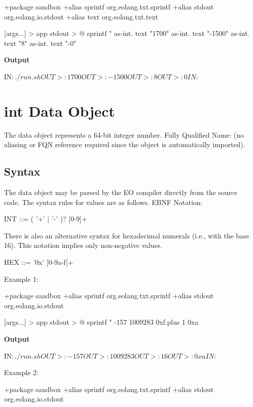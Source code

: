 \documentclass[12pt]{book}
\begin{document}
{\begin{ffcode}
+package sandbox
+alias sprintf org.eolang.txt.sprintf
+alias stdout org.eolang.io.stdout
+alias text org.eolang.txt.text

[args...] > app
  stdout > @
    sprintf
      "%
    as-int.
      text "1700"
    as-int.
      text "-1500"
    as-int.
      text "8"
    as-int.
      text "-0"
\end{ffcode}
\textbf{Output}
\begin{ffcode}
IN$: ./run.sh
OUT>: 1700
OUT>: -1500
OUT>: 8
OUT>: 0
IN$: 
\end{ffcode}

\section{int Data Object}
The  data object represents a 64-bit integer number.
Fully Qualified Name:  (no aliasing or FQN reference required since the object is automatically imported).

\subsection{Syntax}
The  data object may be parsed by the EO compiler directly from the source code. The syntax rules for values are as follows. EBNF Notation:

\begin{ffcode}
INT      ::= ( '+' | '-' )? [0-9]+
\end{ffcode}
There is also an alternative syntax for hexadecimal numerals (i.e., with the base 16). This notation implies only non-negative values.

\begin{ffcode}
HEX      ::= '0x' [0-9a-f]+
\end{ffcode}
Example 1:
\begin{ffcode}
+package sandbox
+alias sprintf org.eolang.txt.sprintf
+alias stdout org.eolang.io.stdout

[args...] > app
  stdout > @
    sprintf
      "%
      -157
      1009283
      0xf.plus 1
      0xa
\end{ffcode}
\textbf{Output}
\begin{ffcode}
IN$: ./run.sh
OUT>: -157
OUT>: 1009283
OUT>: 16
OUT>: 0xa
IN$: 
\end{ffcode}
Example 2:
\begin{ffcode}
+package sandbox
+alias sprintf org.eolang.txt.sprintf
+alias stdout org.eolang.io.stdout
    

\end{ffcode}}
\end{document}
